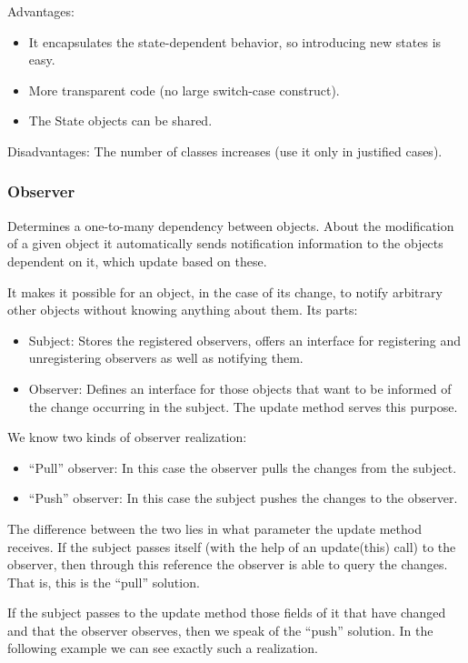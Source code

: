 \documentclass[margin=0px]{article}
\begin{document}
Advantages:
\begin{itemize}
    \item It encapsulates the state-dependent behavior, so introducing new states is easy.
    \item More transparent code (no large switch-case construct).
    \item The State objects can be shared.
\end{itemize}

Disadvantages: The number of classes increases (use it only in justified cases).

\subsubsection{Observer}
Determines a one-to-many dependency between objects. About the modification of a given object it automatically sends notification information to the objects dependent on it, which update based on these.

It makes it possible for an object, in the case of its change, to notify arbitrary other objects without knowing anything about them. Its parts:
\begin{itemize}
    \item Subject: Stores the registered observers, offers an interface for registering and unregistering observers as well as notifying them.
    \item Observer: Defines an interface for those objects that want to be informed of the change occurring in the subject. The update method serves this purpose.
\end{itemize}

We know two kinds of observer realization:
\begin{itemize}
    \item ``Pull'' observer: In this case the observer pulls the changes from the subject.
    \item ``Push'' observer: In this case the subject pushes the changes to the observer.
\end{itemize}

The difference between the two lies in what parameter the update method receives. If the subject passes itself (with the help of an update(this) call) to the observer, then through this reference the observer is able to query the changes. That is, this is the ``pull'' solution.

If the subject passes to the update method those fields of it that have changed and that the observer observes, then we speak of the ``push'' solution. In the following example we can see exactly such a realization.
\end{document}
